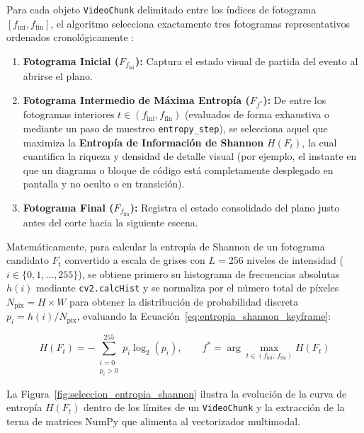 Para cada objeto \texttt{VideoChunk} delimitado entre los índices de fotograma $[f_{\text{ini}}, f_{\text{fin}}]$, el algoritmo selecciona exactamente tres fotogramas representativos ordenados cronológicamente \cite{video_rac2025}: %
\begin{enumerate}
    \item \textbf{Fotograma Inicial ($F_{f_{\text{ini}}}$):} Captura el estado visual de partida del evento al abrirse el plano. %
    \item \textbf{Fotograma Intermedio de Máxima Entropía ($F_{f^*}$):} De entre los fotogramas interiores $t \in (f_{\text{ini}}, f_{\text{fin}})$ (evaluados de forma exhaustiva o mediante un paso de muestreo \texttt{entropy\_step}), se selecciona aquel que maximiza la \textbf{Entropía de Información de Shannon} $H(F_t)$, la cual cuantifica la riqueza y densidad de detalle visual (por ejemplo, el instante en que un diagrama o bloque de código está completamente desplegado en pantalla y no oculto o en transición). %
    \item \textbf{Fotograma Final ($F_{f_{\text{fin}}}$):} Registra el estado consolidado del plano justo antes del corte hacia la siguiente escena. %
\end{enumerate}

Matemáticamente, para calcular la entropía de Shannon de un fotograma candidato $F_t$ convertido a escala de grises con $L = 256$ niveles de intensidad ($i \in \{0, 1, \dots, 255\}$), se obtiene primero su histograma de frecuencias absolutas $h(i)$ mediante \texttt{cv2.calcHist} y se normaliza por el número total de píxeles $N_{\text{pix}} = H \times W$ para obtener la distribución de probabilidad discreta $p_i = h(i) / N_{\text{pix}}$, evaluando la Ecuación~\eqref{eq:entropia_shannon_keyframe}: %

\begin{equation}
H(F_t) = -\sum_{\substack{i=0 \\ p_i > 0}}^{255} p_i \log_2(p_i), \qquad f^* = \arg\max_{t \in (f_{\text{ini}}, \, f_{\text{fin}})} H(F_t)
\label{eq:entropia_shannon_keyframe}
\end{equation} %

La Figura~\ref{fig:seleccion_entropia_shannon} ilustra la evolución de la curva de entropía $H(F_t)$ dentro de los límites de un \texttt{VideoChunk} y la extracción de la terna de matrices NumPy que alimenta al vectorizador multimodal. %

